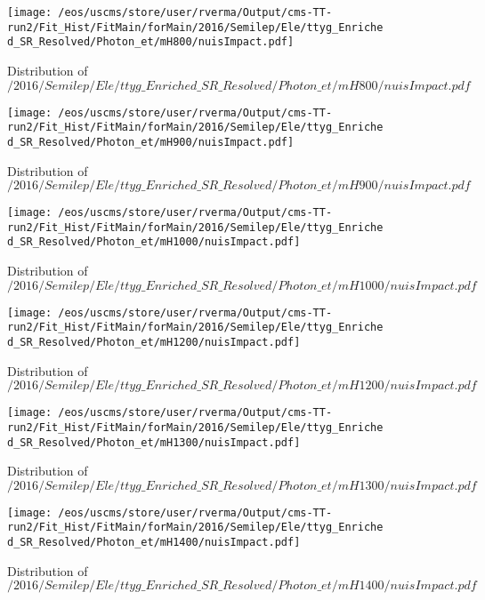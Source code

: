 \begin{figure}
\centering
\texttt{[image: /eos/uscms/store/user/rverma/Output/cms-TT-run2/Fit\_Hist/FitMain/forMain/2016/Semilep/Ele/ttyg\_Enriched\_SR\_Resolved/Photon\_et/mH800/nuisImpact.pdf]}
\caption{Distribution of $/2016/Semilep/Ele/ttyg\_Enriched\_SR\_Resolved/Photon\_et/mH800/nuisImpact.pdf$}
\end{figure}

\begin{figure}
\centering
\texttt{[image: /eos/uscms/store/user/rverma/Output/cms-TT-run2/Fit\_Hist/FitMain/forMain/2016/Semilep/Ele/ttyg\_Enriched\_SR\_Resolved/Photon\_et/mH900/nuisImpact.pdf]}
\caption{Distribution of $/2016/Semilep/Ele/ttyg\_Enriched\_SR\_Resolved/Photon\_et/mH900/nuisImpact.pdf$}
\end{figure}

\begin{figure}
\centering
\texttt{[image: /eos/uscms/store/user/rverma/Output/cms-TT-run2/Fit\_Hist/FitMain/forMain/2016/Semilep/Ele/ttyg\_Enriched\_SR\_Resolved/Photon\_et/mH1000/nuisImpact.pdf]}
\caption{Distribution of $/2016/Semilep/Ele/ttyg\_Enriched\_SR\_Resolved/Photon\_et/mH1000/nuisImpact.pdf$}
\end{figure}

\begin{figure}
\centering
\texttt{[image: /eos/uscms/store/user/rverma/Output/cms-TT-run2/Fit\_Hist/FitMain/forMain/2016/Semilep/Ele/ttyg\_Enriched\_SR\_Resolved/Photon\_et/mH1200/nuisImpact.pdf]}
\caption{Distribution of $/2016/Semilep/Ele/ttyg\_Enriched\_SR\_Resolved/Photon\_et/mH1200/nuisImpact.pdf$}
\end{figure}

\begin{figure}
\centering
\texttt{[image: /eos/uscms/store/user/rverma/Output/cms-TT-run2/Fit\_Hist/FitMain/forMain/2016/Semilep/Ele/ttyg\_Enriched\_SR\_Resolved/Photon\_et/mH1300/nuisImpact.pdf]}
\caption{Distribution of $/2016/Semilep/Ele/ttyg\_Enriched\_SR\_Resolved/Photon\_et/mH1300/nuisImpact.pdf$}
\end{figure}

\begin{figure}
\centering
\texttt{[image: /eos/uscms/store/user/rverma/Output/cms-TT-run2/Fit\_Hist/FitMain/forMain/2016/Semilep/Ele/ttyg\_Enriched\_SR\_Resolved/Photon\_et/mH1400/nuisImpact.pdf]}
\caption{Distribution of $/2016/Semilep/Ele/ttyg\_Enriched\_SR\_Resolved/Photon\_et/mH1400/nuisImpact.pdf$}
\end{figure}

